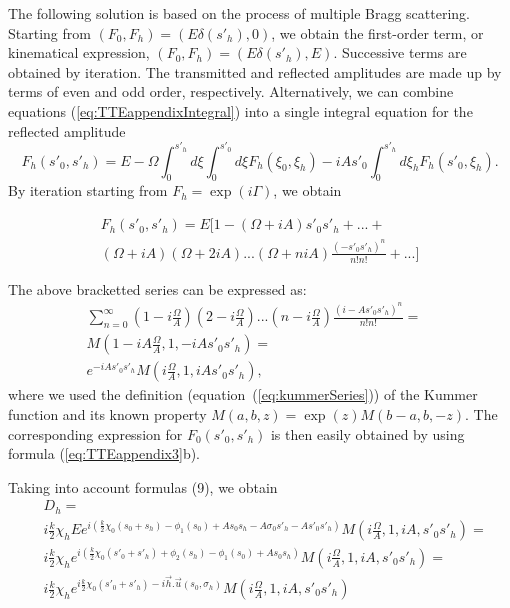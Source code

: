\documentclass[preprint]{iucr}              %
\begin{document}
The following solution is based on the process of multiple Bragg scattering. Starting from 
$(F_0,F_h)=(E\delta(s'_h),0)$, we obtain the first-order term, or kinematical expression, $(F_0,F_h)=(E\delta(s'_h), E)$. Successive terms are obtained by iteration. The transmitted and reflected amplitudes are made up by terms of  even and odd order, respectively. Alternatively, we can combine equations (\ref{eq:TTEappendixIntegral}) into a single integral equation for the reflected amplitude
\begin{equation}
    \label{eq:TTEappendixSingleIntegral}
    F_h(s'_0,s'_h) = E - \Omega \int_0^{s'_h} d \xi \int_0^{s'_0}d \xi F_h(\xi_0,\xi_h) - i A s'_0 \int_0^{s'_h} d\xi_h F_h(s'_0,\xi_h).
\end{equation}
By iteration starting from $F_h=\exp(i\Gamma)$, we obtain

\begin{align}
    \label{eq:TTEappendixSeries}
    F_h(s'_0,s'_h) = E [ 1 - 
    (\Omega+i A) s'_0s'_h + ...+
    \nonumber \\
    (\Omega+iA)(\Omega+2iA)...(\Omega+niA)
    \frac{(-s'_0 s'_h)^n}{n!n!}
    +...]
\end{align}

The above bracketted series can be expressed as:
\begin{align}
    \label{eq:Series}
    \sum_{n=0}^{\infty} (1-i\frac{\Omega}{A})
    (2-i\frac{\Omega}{A})...
    (n-i\frac{\Omega}{A})
    \frac{(i-A s'_0 s'_h)^n}{n!n!}=&\\
    M(1-iA\frac{\Omega}{A},1,-iAs'_0 s'_h) = & \\
    e^{-iAs'_0 s'_h}M(i\frac{\Omega}{A},1,iAs'_0s'_h),
\end{align}
where we used the definition (equation~(\ref{eq:kummerSeries})) of the Kummer function and its known property $M(a,b,z)=\exp(z)M(b-a,b,-z)$.
The corresponding expression for $F_0(s'_0,s'_h)$ is then easily obtained by using formula (\ref{eq:TTEappendix3}b).

Taking into account  formulas (9), we obtain
\begin{align}
\label{eq:appendixFinal}
  &D_h= \nonumber \\
  &i\frac{k}{2}\chi_h E
  e^{i(\frac{k}{2}\chi_0(s_0+s_h)-
  \phi_1(s_0) + A s_0 s_h -A \sigma_0 s'_h - As'_0 s'_h)}
  M(i\frac{\Omega}{A},1,iA,s'_0 s'_h)
  = \nonumber \\
  &i\frac{k}{2}\chi_h 
  e^{i(\frac{k}{2}\chi_0(s'_0+s'_h)+
  \phi_2(s_h) - \phi_1(s_0) + A s_0 s_h )}
  M(i\frac{\Omega}{A},1,iA,s'_0 s'_h)
  = \nonumber \\
  &i\frac{k}{2}\chi_h 
  e^{i\frac{k}{2}\chi_0(s'_0+s'_h)
  -i \vec h . \vec u(s_0,\sigma_h)}
  M(i\frac{\Omega}{A},1,iA,s'_0 s'_h)
\end{align}
\end{document}
